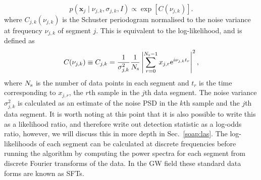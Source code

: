 %
\begin{equation}
\label{soap:single:likelihood}
p({\bm x_j} \mid \nu_{j,k}, \sigma_{j,k}, I) \propto
\exp\left[{C(\nu_{j,k})}\right].
\end{equation}
%
where
$C_{j,k}(\nu_{j,k})$ is the Schuster periodogram normalised to the noise variance at
frequency $\nu_{j,k}$ of segment $j$. This is equivalent to the log-likelihood, and is defined as
%
\begin{equation}
\label{soap:periodogram}
C(\nu_{j,k}) \equiv C_{j,k}=  \frac{1}{\sigma_{j,k}^2}\frac{1}{N_{\rm s}}\left|\sum_{r=0}^{N_{\rm
s}-1}x_{j,r} {\rm
e}^{i\nu_{j,k} t_r}\right|^2,
\end{equation}
%
where $N_{\rm s}$ is the number of data points in each segment and $t_{r}$ is the time corresponding to $x_{j,r}$, the $r$th sample in the $j$th data segment. The noise variance $\sigma_{j,k}^2$ is calculated as an estimate of the noise \gls{PSD} in the $k$th sample and the $j$th data segment. It is worth noting at this point that it is also possible to write this as a likelihood ratio, and therefore write out detection statistic as a log-odds ratio, however, we will discuss this in more depth in Sec.~\ref{soap:las}. The log-likelihoods of each segment can be calculated at discrete frequencies before running the algorithm by computing the power spectra for each segment from discrete Fourier transforms of the data. In the \gls{GW} field these standard data forms are known as \glspl{SFT}.

